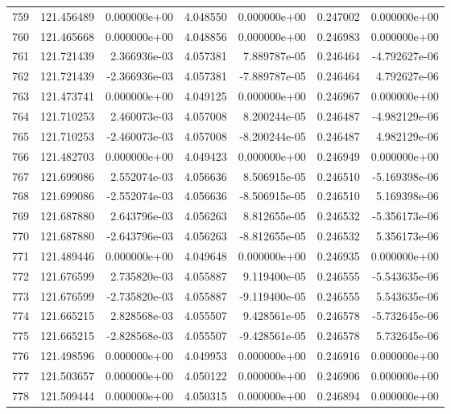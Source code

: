 \begin{tabular}{rrrrrrr}
 759 & 121.456489 &  0.000000e+00 &  4.048550 &  0.000000e+00 &    0.247002 &  0.000000e+00 \\
 760 & 121.465668 &  0.000000e+00 &  4.048856 &  0.000000e+00 &    0.246983 &  0.000000e+00 \\
 761 & 121.721439 &  2.366936e-03 &  4.057381 &  7.889787e-05 &    0.246464 & -4.792627e-06 \\
 762 & 121.721439 & -2.366936e-03 &  4.057381 & -7.889787e-05 &    0.246464 &  4.792627e-06 \\
 763 & 121.473741 &  0.000000e+00 &  4.049125 &  0.000000e+00 &    0.246967 &  0.000000e+00 \\
 764 & 121.710253 &  2.460073e-03 &  4.057008 &  8.200244e-05 &    0.246487 & -4.982129e-06 \\
 765 & 121.710253 & -2.460073e-03 &  4.057008 & -8.200244e-05 &    0.246487 &  4.982129e-06 \\
 766 & 121.482703 &  0.000000e+00 &  4.049423 &  0.000000e+00 &    0.246949 &  0.000000e+00 \\
 767 & 121.699086 &  2.552074e-03 &  4.056636 &  8.506915e-05 &    0.246510 & -5.169398e-06 \\
 768 & 121.699086 & -2.552074e-03 &  4.056636 & -8.506915e-05 &    0.246510 &  5.169398e-06 \\
 769 & 121.687880 &  2.643796e-03 &  4.056263 &  8.812655e-05 &    0.246532 & -5.356173e-06 \\
 770 & 121.687880 & -2.643796e-03 &  4.056263 & -8.812655e-05 &    0.246532 &  5.356173e-06 \\
 771 & 121.489446 &  0.000000e+00 &  4.049648 &  0.000000e+00 &    0.246935 &  0.000000e+00 \\
 772 & 121.676599 &  2.735820e-03 &  4.055887 &  9.119400e-05 &    0.246555 & -5.543635e-06 \\
 773 & 121.676599 & -2.735820e-03 &  4.055887 & -9.119400e-05 &    0.246555 &  5.543635e-06 \\
 774 & 121.665215 &  2.828568e-03 &  4.055507 &  9.428561e-05 &    0.246578 & -5.732645e-06 \\
 775 & 121.665215 & -2.828568e-03 &  4.055507 & -9.428561e-05 &    0.246578 &  5.732645e-06 \\
 776 & 121.498596 &  0.000000e+00 &  4.049953 &  0.000000e+00 &    0.246916 &  0.000000e+00 \\
 777 & 121.503657 &  0.000000e+00 &  4.050122 &  0.000000e+00 &    0.246906 &  0.000000e+00 \\
 778 & 121.509444 &  0.000000e+00 &  4.050315 &  0.000000e+00 &    0.246894 &  0.000000e+00 \\

\end{tabular}
